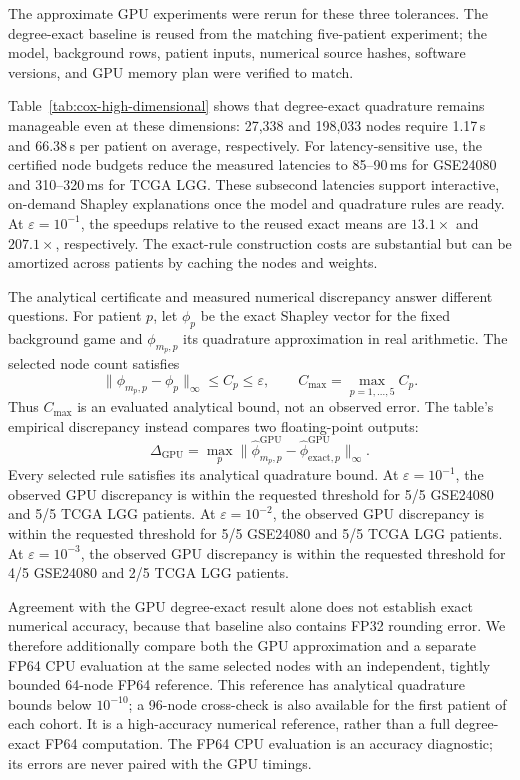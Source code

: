 The approximate GPU experiments were rerun for these three tolerances.
The degree-exact baseline is reused from the matching five-patient experiment;
the model, background rows, patient inputs, numerical source hashes,
software versions, and GPU memory plan were verified to match.

Table~\ref{tab:cox-high-dimensional} shows that degree-exact quadrature remains
manageable even at these dimensions: 27,338 and 198,033 nodes require
1.17\,s and 66.38\,s per patient on average, respectively.
For latency-sensitive use, the certified node budgets reduce the measured
latencies to 85--90\,ms for GSE24080
and 310--320\,ms for TCGA LGG.
These subsecond latencies support interactive, on-demand Shapley
explanations once the model and quadrature rules are ready. At
$\varepsilon=10^{-1}$, the speedups relative to the reused exact means are
$13.1\times$ and
$207.1\times$, respectively.
The exact-rule construction costs are substantial but can be amortized
across patients by caching the nodes and weights.

The analytical certificate and measured numerical discrepancy answer
different questions. For patient $p$, let $\phi_p$ be the exact Shapley
vector for the fixed background game and $\phi_{m_p,p}$ its quadrature
approximation in real arithmetic. The selected node count satisfies
\[
\|\phi_{m_p,p}-\phi_p\|_\infty\le C_p\le\varepsilon,
\qquad C_{\max}=\max_{p=1,\ldots,5}C_p.
\]
Thus $C_{\max}$ is an evaluated analytical bound, not an observed error.
The table's empirical discrepancy instead compares two floating-point outputs:
\[
\Delta_{\mathrm{GPU}}=
\max_p\|\widehat\phi^{\mathrm{GPU}}_{m_p,p}
-\widehat\phi^{\mathrm{GPU}}_{\mathrm{exact},p}\|_\infty.
\]
Every selected rule satisfies its analytical quadrature bound.
At $\varepsilon=10^{-1}$, the observed GPU
discrepancy is within the requested threshold for 5/5 GSE24080
and 5/5 TCGA LGG patients.
At $\varepsilon=10^{-2}$, the observed GPU
discrepancy is within the requested threshold for 5/5 GSE24080
and 5/5 TCGA LGG patients.
At $\varepsilon=10^{-3}$, the observed GPU
discrepancy is within the requested threshold for 4/5 GSE24080
and 2/5 TCGA LGG patients.

Agreement with the GPU degree-exact result alone does not establish exact
numerical accuracy, because that baseline also contains FP32 rounding error.
We therefore additionally compare both the GPU approximation and a separate
FP64 CPU evaluation at the same selected nodes with an independent,
tightly bounded 64-node FP64 reference. This reference has analytical
quadrature bounds below $10^{-10}$; a 96-node cross-check is also available
for the first patient of each cohort. It is a high-accuracy numerical
reference, rather than a full degree-exact FP64 computation.
The FP64 CPU evaluation is an accuracy diagnostic; its errors are never
paired with the GPU timings.

